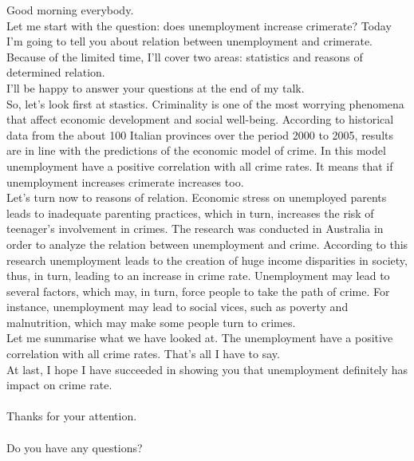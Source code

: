 \documentclass[a4paper,12pt]{article}
\begin{document}
Good morning everybody.\\

Let me start with the question: does unemployment increase crimerate?
Today I’m going to tell you about relation between unemployment and crimerate.\\

Because of the limited time, I’ll cover two areas: statistics and reasons of determined relation.\\

I’ll be happy to answer your questions at the end of my talk.\\

So, let’s look first at stastics. Criminality is one of the most worrying phenomena that affect economic development and social well-being.
According to historical data from the about 100 Italian provinces over the period 2000 to 2005, results are in line with the predictions of the economic model of crime. In this model unemployment have a positive correlation with all crime rates. It means that if unemployment increases crimerate increases too.\\

Let’s turn now to reasons of relation. Economic stress on unemployed parents leads to inadequate parenting practices, which in turn, increases the risk of teenager’s involvement in crimes. The research was conducted in Australia in order to analyze the relation between unemployment and crime. According to this research unemployment leads to the creation of huge income disparities in society, thus, in turn, leading to an increase in crime rate. Unemployment may lead to several factors, which may, in turn, force people to take the path of crime. For instance, unemployment may lead to social vices, such as poverty and malnutrition, which may make some people turn to crimes.\\

Let me summarise what we have looked at. The unemployment have a positive correlation with all crime rates.
That’s all I have to say.\\

At last, I hope I have succeeded in showing you that unemployment definitely has impact on crime rate.\\
\\
Thanks for your attention.\\
\\
Do you have any questions?\\
\end{document}
